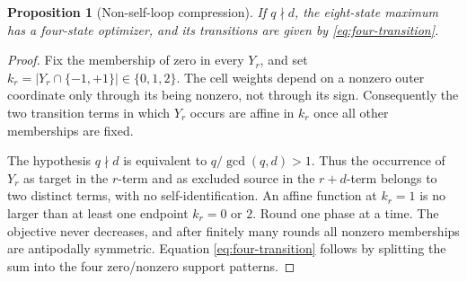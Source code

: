 \documentclass[11pt]{article}
\newtheorem{proposition}[theorem]{Proposition}
\theoremstyle{definition}
\theoremstyle{remark}
\begin{document}
\begin{proposition}[Non-self-loop compression]
\label{prop:compression}
If \(q\nmid d\), the eight-state maximum has a four-state optimizer, and
its transitions are given by \eqref{eq:four-transition}.
\end{proposition}

\begin{proof}
Fix the membership of zero in every \(Y_r\), and set
\(k_r=|Y_r\cap\{-1,+1\}|\in\{0,1,2\}\).  The cell weights depend on a
nonzero outer coordinate only through its being nonzero, not through its
sign.  Consequently the two transition terms in which \(Y_r\) occurs
are affine in \(k_r\) once all other memberships are fixed.

The hypothesis \(q\nmid d\) is equivalent to
\(q/\gcd(q,d)>1\).  Thus the occurrence of \(Y_r\) as target in the
\(r\)-term and as excluded source in the \(r+d\)-term belongs to two
distinct terms, with no self-identification.  An affine function at
\(k_r=1\) is no larger than at least one endpoint \(k_r=0\) or \(2\).
Round one phase at a time.  The objective never decreases, and after
finitely many rounds all nonzero memberships are antipodally symmetric.
Equation \eqref{eq:four-transition} follows by splitting the sum into
the four zero/nonzero support patterns.
\end{proof}
\end{document}
